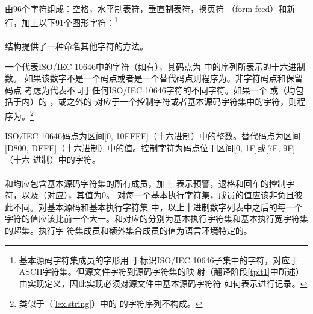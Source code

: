 \paragraph{} %
由96个字符组成：空格，水平制表符，垂直制表符，换页符
（form feed）和新行，加上以下91个图形字符：\footnote{基本源码字符集成员的字形用
于标识ISO/IEC 10646子集中的字符，对应于ASCII字符集。但源文件字符到源码字符集的映
射（翻译阶段\ref{tpit1}中所述）由实现定义，因此实现必须对源文件中基本源码字符符
如何表示进行记录。}

\mbox{\qquad {}}      \par
\mbox{\qquad {}}      \par
\mbox{\qquad {}}                                      \par
\mbox{\qquad {}}

\paragraph{} %
结构提供了一种命名其他字符的方法。

一个代表ISO/IEC 10646中的字符（如有），其码点为
中的序列所表示的十六进制数。
如果该数字不是一个码点或者是一个替代码点则程序为\illform{}。非字符码点和保留码点
考虑为代表不同于任何ISO/IEC 10646字符的不同字符。如果一个
或（均包括于内）的
，或之外的
对应于一个控制字符或者基本源码字符集中的字符，则程
序为\illform{}。\footnote{类似于（\ref{lex.string}）中的
的字符序列不构成。}

\begin{note}
  ISO/IEC 10646码点为区间[0, 10FFFF]（十六进制）中的整数。替代码点为区间
  [D800, DFFF]（十六进制）中的值。控制字符为码点位于区间[0, 1F]或[7F, 9F]（十六
  进制）中的字符。
\end{note}

\paragraph{} %
和均应包含基本源码字符集的所有成员，加上
表示预警，退格和回车的控制字符，以及（对应），其值为0。
对每一个基本执行字符集，成员的值应该非负且彼此不同。对基本源码和基本执行字符集
中，以上十进制数字列表中之后的每一个字符的值应该比前一个大一。和对应的分别为基本执行字符集和基本执行宽字符集的超集。执行字
符集成员和额外集合成员的值为语言环境特定的。
